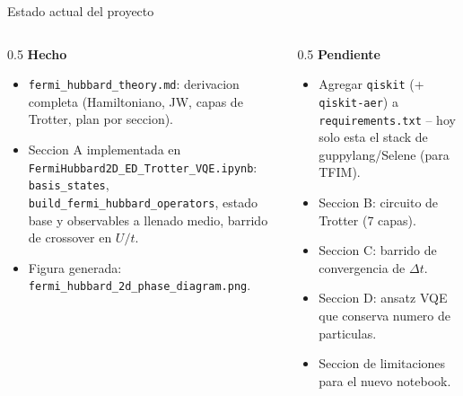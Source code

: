 \documentclass[aspectratio=169,10pt]{beamer}
\newcommand{\good}[1]{\textcolor{qAccent}{\textbf{#1}}}
\newcommand{\warn}[1]{\textcolor{qWarn}{\textbf{#1}}}
\begin{document}
\begin{frame}{Estado actual del proyecto}
  \begin{columns}[T]
    \begin{column}{0.5\textwidth}
      \textbf{\good{Hecho}}
      \begin{itemize}
        \item \texttt{fermi\_hubbard\_theory.md}: derivacion completa (Hamiltoniano, JW,
          capas de Trotter, plan por seccion).
        \item Seccion A implementada en
          \texttt{FermiHubbard2D\_ED\_Trotter\_VQE.ipynb}:
          \texttt{basis\_states}, \texttt{build\_fermi\_hubbard\_operators}, estado base y
          observables a llenado medio, barrido de crossover en $U/t$.
        \item Figura generada: \texttt{fermi\_hubbard\_2d\_phase\_diagram.png}.
      \end{itemize}
    \end{column}
    \begin{column}{0.5\textwidth}
      \textbf{\warn{Pendiente}}
      \begin{itemize}
        \item Agregar \texttt{qiskit} (+ \texttt{qiskit-aer}) a \texttt{requirements.txt} --
          hoy solo esta el stack de guppylang/Selene (para TFIM).
        \item Seccion B: circuito de Trotter (7 capas).
        \item Seccion C: barrido de convergencia de $\Delta t$.
        \item Seccion D: ansatz VQE que conserva numero de particulas.
        \item Seccion de limitaciones para el nuevo notebook.
      \end{itemize}
    \end{column}
  \end{columns}
\end{frame}
\end{document}
